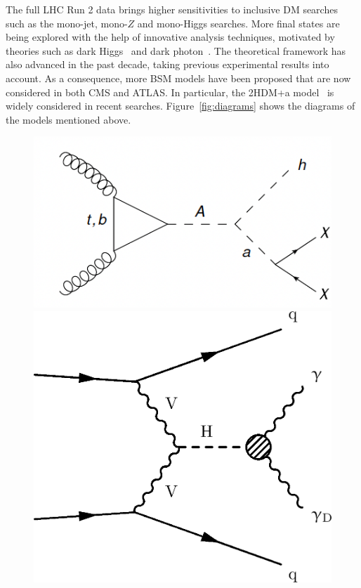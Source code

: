 \documentclass{moriond}
\begin{document}
The full LHC Run 2 data brings higher
sensitivities to inclusive DM searches such as the mono-jet, mono-$Z$ and
mono-Higgs searches. More final states are being explored with the help of
innovative analysis techniques, motivated by theories such as dark
Higgs~\cite{DarkH} and dark photon~\cite{DarkPh}. The
theoretical framework has also advanced in the past decade, taking previous
experimental results into account. As a consequence, more BSM models have been proposed that are now considered in both CMS and ATLAS. In particular,
the 2HDM+a model~\cite{2HDM} is widely considered in recent searches.
Figure~\ref{fig:diagrams} shows the diagrams of the models mentioned above.

\begin{figure} [htb]
\begin{minipage}{0.32\linewidth}
\centerline{\includegraphics[width=0.7\linewidth]{2HDM_a}}
\end{minipage}
\begin{minipage}{0.32\linewidth}
\centerline{\includegraphics[width=0.7\linewidth]{HiggsDarkPhotonDiagram}}
\end{minipage}
\begin{minipage}{0.32\linewidth}

\end{minipage}
\end{figure}
\end{document}
